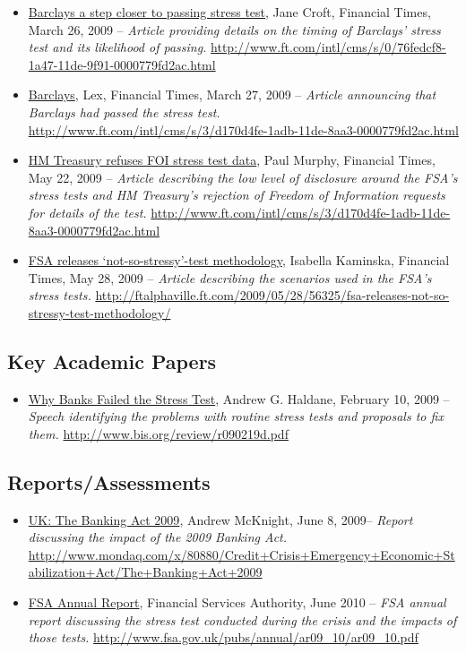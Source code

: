 \documentclass[12pt]{article}
\begin{document}
\begin{itemize}
\item
\ul{Barclays a step closer to passing stress test}, Jane Croft, Financial Times, March 26, 2009 -- \emph{Article providing details on the timing of Barclays' stress test and its likelihood of passing.} \url{http://www.ft.com/intl/cms/s/0/76fedcf8-1a47-11de-9f91-0000779fd2ac.html}
\item
\ul{Barclays}, Lex, Financial Times, March 27, 2009 -- \emph{Article announcing that Barclays had passed the stress test.} \url{http://www.ft.com/intl/cms/s/3/d170d4fe-1adb-11de-8aa3-0000779fd2ac.html}
\item
\ul{HM Treasury refuses FOI stress test data}, Paul Murphy, Financial Times, May 22, 2009 -- \emph{Article describing the low level of disclosure around the FSA's stress tests and HM Treasury's rejection of Freedom of Information requests for details of the test.} \url{http://www.ft.com/intl/cms/s/3/d170d4fe-1adb-11de-8aa3-0000779fd2ac.html}
\item
\ul{FSA releases ‘not-so-stressy’-test methodology}, Isabella Kaminska, Financial Times, May 28, 2009 -- \emph{Article describing the scenarios used in the FSA's stress tests.} \url{http://ftalphaville.ft.com/2009/05/28/56325/fsa-releases-not-so-stressy-test-methodology/}
\end{itemize}

\subsection{Key Academic Papers}

\begin{itemize}
\item
\ul{Why Banks Failed the Stress Test},
 Andrew G. Haldane, February 10, 2009 -- \emph{Speech identifying the problems with routine stress tests and proposals to fix them.} \url{http://www.bis.org/review/r090219d.pdf}
\end{itemize}

\subsection{Reports/Assessments}

\begin{itemize}
\item
\ul{UK: The Banking Act 2009},
Andrew McKnight, June 8, 2009-- \emph{Report discussing the impact of the 2009 Banking Act.} \url{http://www.mondaq.com/x/80880/Credit+Crisis+Emergency+Economic+Stabilization+Act/The+Banking+Act+2009}
\item
\ul{FSA Annual Report}, Financial Services Authority, June 2010 -- \emph{FSA annual report discussing the stress test conducted during the crisis and the impacts of those tests.} \url{http://www.fsa.gov.uk/pubs/annual/ar09_10/ar09_10.pdf}
\end{itemize}
\end{document}
